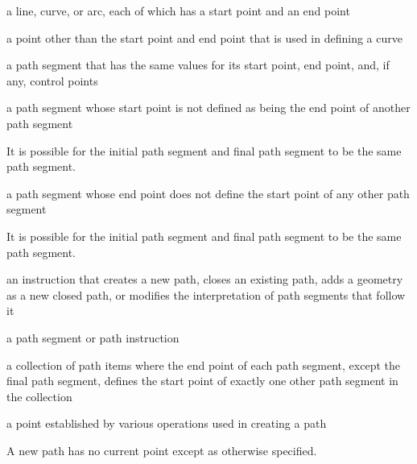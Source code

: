 
a line, \bezierlocal curve, or arc, each of which has a start point and an end point

a point other than the start point and end point that is used in defining a \bezierlocal curve

a path segment that has the same values for its start point, end point, and, if any, control points

a path segment whose start point is not defined as being the end point of another path segment
\begin{note}
It is possible for the initial path segment and final path segment to be the same path segment.
\end{note}

a path segment whose end point does not define the start point of any other path segment
\begin{note}
It is possible for the initial path segment and final path segment to be the same path segment.
\end{note}

an instruction that creates a new path, closes an existing path, adds a geometry as a new closed path, or modifies the interpretation of path segments that follow it

a path segment or path instruction

a collection of path items where the end point of each path segment, except the final path segment, defines the start point of exactly one other path segment in the collection

a point established by various operations used in creating a path
\begin{note}
A new path has no current point except as otherwise specified.
\end{note}

